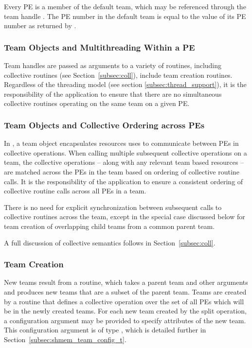 Every \ac{PE} is a member of the default team, which may be referenced
through the team handle .
The \ac{PE} number in the default team is equal to the
value of its \ac{PE} number as returned by .

\subsubsection*{Team Objects and Multithreading Within a \ac{PE}}

Team handles are passed as arguments to a variety of \openshmem routines,
including collective routines (see Section~\ref{subsec:coll}), include team
creation routines.  Regardless of the \openshmem threading model
(see section \ref{subsec:thread_support}), it is the responsibility
of the application to ensure that there are no simultaneous collective
routines operating on the same \openshmem team on a given \ac{PE}.

\subsubsection*{Team Objects and Collective Ordering across \acp{PE}}

In \openshmem, a team object encapsulates resources uses to communicate
between \acp{PE} in collective operations. When calling multiple subsequent
collective operations on a team, the collective operations -- along with any
relevant team based resources -- are matched across the \acp{PE} in the team
based on ordering of collective routine calls. It is the responsibility
of the application to ensure a consistent ordering of collective routine calls
across all \acp{PE} in a team.

There is no need for explicit synchronization between subsequent calls
to collective routines across the team, except in the special case discussed
below for team creation of overlapping child teams from a common parent team.

A full discussion of collective semantics follows in Section~\ref{subsec:coll}.

\subsubsection*{Team Creation}

New teams result from a  routine, which takes a parent team
and other arguments and produces new teams that are a subset of the parent
team. Teams are created by a  routine that defines a
collective operation over the set of all \acp{PE} which will be in the newly created
teams. For each new team created by the split operation, a configuration argument
may be provided to specify attributes of the new team.
This configuration argument is of type , which
is detailed further in Section~\ref{subsec:shmem_team_config_t}.

